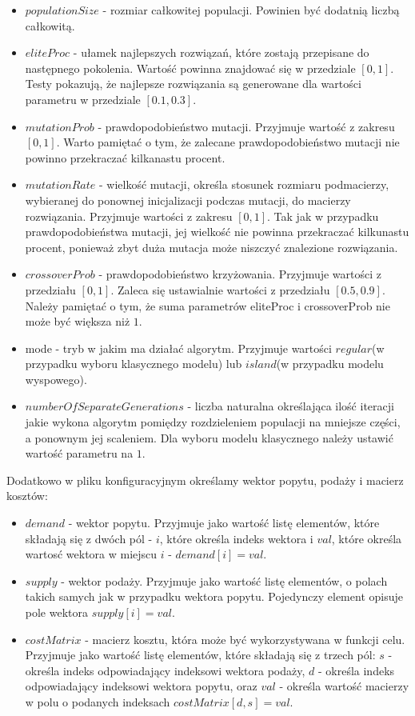 \begin{itemize}
    \item $populationSize$ - rozmiar całkowitej populacji. Powinien być dodatnią liczbą całkowitą.
    \item $eliteProc$ - ułamek najlepszych rozwiązań, które zostają przepisane do następnego pokolenia. 
    Wartość powinna znajdować się w przedziale $[0, 1]$. Testy pokazują, że najlepsze rozwiązania są generowane dla wartości parametru w przedziale
    $[0.1, 0.3]$.
    \item $mutationProb$ - prawdopodobieństwo mutacji. Przyjmuje wartość z zakresu $[0, 1]$. Warto pamiętać o tym, że zalecane prawdopodobieństwo 
    mutacji nie powinno przekraczać kilkanastu procent.
    \item $mutationRate$ - wielkość mutacji, określa stosunek rozmiaru podmacierzy, wybieranej do ponownej inicjalizacji podczas mutacji, 
    do macierzy rozwiązania. Przyjmuje wartości z zakresu $[0, 1]$. Tak jak w przypadku prawdopodobieństwa mutacji, jej wielkość nie powinna 
    przekraczać kilkunastu procent, ponieważ zbyt duża mutacja może niszczyć znalezione rozwiązania.
    \item $crossoverProb$ - prawdopodobieństwo krzyżowania. Przyjmuje wartości z przedziału $[0, 1]$. Zaleca się ustawialnie wartości z przedziału 
    $[0.5, 0.9]$. Należy pamiętać o tym, że suma parametrów eliteProc i crossoverProb nie może być większa niż $1$.
    \item mode - tryb w jakim ma działać algorytm. Przyjmuje wartości $regular$(w przypadku wyboru klasycznego modelu) lub $island$(w przypadku 
    modelu wyspowego).
    \item $numberOfSeparateGenerations$ - liczba naturalna określająca ilość iteracji jakie wykona algorytm pomiędzy rozdzieleniem populacji na 
    mniejsze części, a ponownym jej scaleniem. Dla wyboru modelu klasycznego należy ustawić wartość parametru na $1$.
\end{itemize}

Dodatkowo w pliku konfiguracyjnym określamy wektor popytu, podaży i macierz kosztów:

\begin{itemize}
    \item $demand$ - wektor popytu. Przyjmuje jako wartość listę elementów, które składają się z dwóch pól - $i$, które określa indeks wektora i 
    $val$, które określa wartosć wektora w miejscu $i$ - $demand[i] = val$.
    \item $supply$ - wektor podaży. Przyjmuje jako wartość listę elementów, o polach takich samych jak w przypadku wektora popytu. Pojedynczy element 
    opisuje pole wektora $supply[i] = val$.
    \item $costMatrix$ - macierz kosztu, która może być wykorzystywana w funkcji celu. Przyjmuje jako wartość listę elementów, które składają się 
    z trzech pól: $s$ - określa indeks odpowiadający indeksowi wektora podaży, $d$ - określa indeks odpowiadający indeksowi wektora popytu, oraz 
    $val$ - określa wartość macierzy w polu o podanych indeksach $costMatrix[d, s] = val$.
\end{itemize}

